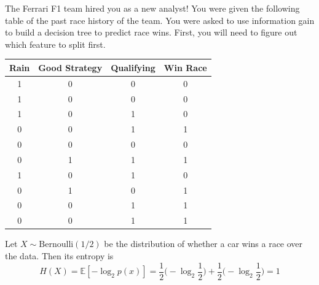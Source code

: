   \begin{example}
    \label{ex:ferrari-f1-race}
    The Ferrari F1 team hired you as a new analyst! You were given the following table of the past race history of the team. You were asked to use information gain to build a decision tree to predict race wins. First, you will need to figure out which feature to split first. 
    \begin{center}
      \begin{tabular}[c]{c|c|c||c}
      Rain & Good Strategy & Qualifying & Win Race \\ \hline
      1 & 0 & 0 & 0 \\
      1 & 0 & 0 & 0 \\
      1 & 0 & 1 & 0 \\
      0 & 0 & 1 & 1 \\
      0 & 0 & 0 & 0 \\
      0 & 1 & 1 & 1 \\
      1 & 0 & 1 & 0 \\
      0 & 1 & 0 & 1 \\
      0 & 0 & 1 & 1 \\
      0 & 0 & 1 & 1 \\
      \end{tabular}
    \end{center}

    Let $X \sim \mathrm{Bernoulli}(1/2)$ be the distribution of whether a car wins a race over the data. Then its entropy is 
    \begin{equation}
      H(X) = \mathbb{E}[-\log_2 p(x)] = \frac{1}{2} \big( -\log_2 \frac{1}{2} \big) + \frac{1}{2} \big( -\log_2 \frac{1}{2} \big) = 1
    \end{equation}


\end{example}
